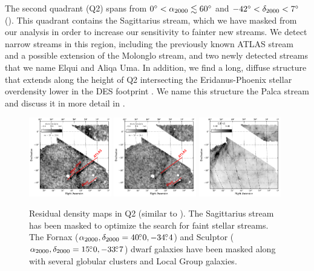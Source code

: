 \documentclass[twocolumn]{aastex61}
\begin{document}
The second quadrant (Q2) spans from $0{}^{\circ} < {\alpha_{2000}} \lesssim 60{}^{\circ}$ and $-42{}^{\circ} < {\delta_{2000}} < 7{}^{\circ}$ (). 
This quadrant contains the Sagittarius stream, which we have masked from our analysis in order to increase our sensitivity to fainter new streams. 
We detect  narrow streams in this region, including the previously known ATLAS \citep{Koposov:2014} stream and a possible extension of the Molonglo \citep{Grillmair:2017} stream, and two newly detected streams that we name Elqui and Aliqa Uma. 
In addition, we find a long, diffuse structure that extends along the height of Q2 intersecting the Eridanus-Phoenix stellar overdensity lower in the DES footprint \citep{Li:2016}. 
We name this structure the Palca stream and discuss it in more detail in .

\begin{figure}[]
  \centering
  \includegraphics[width=0.32\textwidth]{residual_q2_m17p6_v17p2_label}
  \includegraphics[width=0.32\textwidth]{residual_q2_m18p4_v17p2_label}
  \includegraphics[width=0.32\textwidth]{sfd_ebv_q2}
  \caption{Residual density maps in Q2 (similar to ).
    The Sagittarius stream has been masked to optimize the search for faint stellar streams.
    The Fornax (${\alpha_{2000}},{\delta_{2000}} = 40\mbox{$.\!\!^\circ$}0,-34\mbox{$.\!\!^\circ$}4$) and Sculptor (${\alpha_{2000}},{\delta_{2000}} = 15\mbox{$.\!\!^\circ$}0,-33\mbox{$.\!\!^\circ$}7$) dwarf galaxies have been masked along with several globular clusters and Local Group galaxies.
}
\end{figure}
\end{document}
